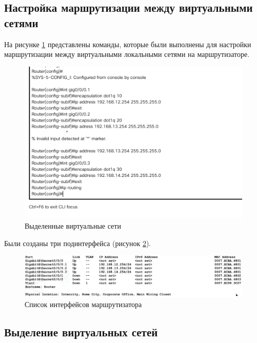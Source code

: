 \documentclass[12pt]{report}
\begin{document}
\subsection*{Настройка маршрутизации между виртуальными сетями}

На рисунке \ref{fig:5} представлены команды, которые были выполнены для настройки маршрутизации между виртуальными локальными сетями на маршрутизаторе.

\begin{figure}[H]
	\begin{center}
		\includegraphics[scale=0.7]{img/5.png}
	\end{center}
	\caption{Выделенные виртуальные сети}
	\label{fig:5}
\end{figure}

Были созданы три подинтерфейса (рисунок \ref{fig:6}).

\begin{figure}[H]
	\begin{center}
		\includegraphics[scale=0.7]{img/6.png}
	\end{center}
	\caption{Список интерфейсов маршрутизатора}
	\label{fig:6}
\end{figure}

\subsection*{Выделение виртуальных сетей}
\end{document}

